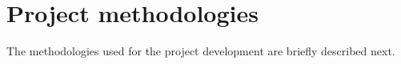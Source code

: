 \section{Project methodologies}
The methodologies used for the project development are briefly described next.


